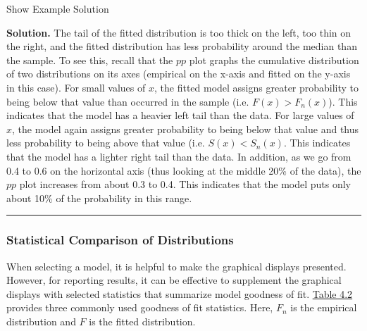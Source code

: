 \documentclass[]{book}
\theoremstyle{definition}
\theoremstyle{definition}
\theoremstyle{definition}
\theoremstyle{remark}
\begin{document}
Show Example Solution

\hypertarget{toggleExampleSelect.1.6}{}
\textbf{Solution.} The tail of the fitted distribution is too thick on
the left, too thin on the right, and the fitted distribution has less
probability around the median than the sample. To see this, recall that
the \(pp\) plot graphs the cumulative distribution of two distributions
on its axes (empirical on the x-axis and fitted on the y-axis in this
case). For small values of \(x\), the fitted model assigns greater
probability to being below that value than occurred in the sample (i.e.
\(F(x) > F_n(x)\)). This indicates that the model has a heavier left
tail than the data. For large values of \(x\), the model again assigns
greater probability to being below that value and thus less probability
to being above that value (i.e. \(S(x) < S_n(x)\). This indicates that
the model has a lighter right tail than the data. In addition, as we go
from 0.4 to 0.6 on the horizontal axis (thus looking at the middle 20\%
of the data), the \(pp\) plot increases from about 0.3 to 0.4. This
indicates that the model puts only about 10\% of the probability in this
range.

\begin{center}\rule{0.5\linewidth}{\linethickness}\end{center}

\subsubsection{Statistical Comparison of
Distributions}\label{S:MS:Tools:Stats}

When selecting a model, it is helpful to make the graphical displays
presented. However, for reporting results, it can be effective to
supplement the graphical displays with selected statistics that
summarize model goodness of fit. \protect\hyperlink{tab:42}{Table 4.2}
provides three commonly used goodness of fit statistics. Here, \(F_n\)
is the empirical distribution and \(F\) is the fitted distribution.
\end{document}
